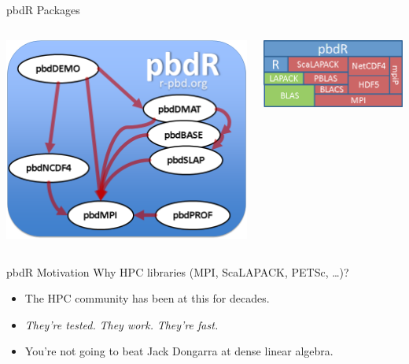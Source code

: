 \begin{frame}
  \begin{block}{pbdR Packages}
    \begin{center}
      \begin{columns}
        \begin{column}{.52\textwidth}
      \includegraphics[scale=.4]{../common/pics/pbdR}
        \end{column}
        \hspace{.05cm}
        \begin{column}{.4\textwidth}
      \includegraphics[scale=.45]{../common/pics/libs}
        \end{column}
      \end{columns}
    \end{center}
  \end{block}
\end{frame}


\begin{frame}
  \begin{block}{pbdR Motivation}
  Why HPC libraries (MPI, ScaLAPACK, PETSc, \dots)?
  \begin{itemize}[<+-|alert@+>]
    \item The HPC community has been at this for decades.
    \item \emph{They're tested.} \emph{They work.}  \emph{They're fast.}
    \item You're not going to beat Jack Dongarra at dense 
linear algebra.
  \end{itemize}
\end{block}
\end{frame}



